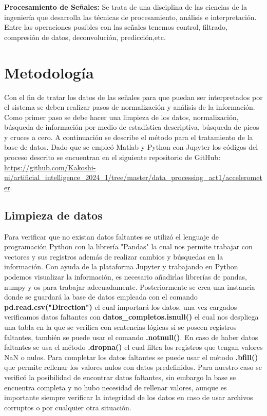 \documentclass[11pt,a4paper]{article}
\begin{document}
\textbf{Procesamiento de Señales:} Se trata de una disciplina de las ciencias de la ingeniería que desarrolla las técnicas de procesamiento, análisis e interpretación. Entre las operaciones posibles con las señales tenemos control, filtrado, compresión de datos, deconvolución, predicción,etc.\cite{signal_processing}
\section{Metodología}
Con el fin de tratar los datos de las señales para que puedan ser interpretados por el sistema se deben realizar pasos de normalización y análisis de la información. Como primer paso se debe hacer una limpieza de los datos, normalización, búsqueda de información por medio de estadística descriptiva, búsqueda de picos y cruces a cero. A continuación se describe el método para el tratamiento de la base de datos. Dado que se empleó Matlab y Python con Jupyter los códigos del proceso descrito se encuentran en el siguiente repositorio de GitHub: \url{https://github.com/Kakoshi-ui/artificial\_intelligence\_2024\_I/tree/master/data\_processing\_act1/accelerometer}.
\subsection{Limpieza de datos}
Para verificar que no existan datos faltantes se utilizó el lenguaje de programación Python con la librería "Pandas" la cual nos permite trabajar con vectores y sus registros además de realizar cambios y búsquedas en la información. Con ayuda de la plataforma Jupyter y trabajando en Python podemos visualizar la información, es necesario añadirlas librerías de pandas, numpy y os para trabajar adecuadamente. Posteriormente se crea una instancia donde se guardará la base de datos empleada con el comando \textbf{pd.read.csv("Direction")} el cual importará los datos. una vez cargados verificamos datos faltantes con \textbf{datos\_completos.isnull()} el cual nos despliega una tabla en la que se verifica con sentencias lógicas si se poseen registros faltantes, también se puede usar el comando \textbf{.notnull()}. En caso de haber datos faltantes se usa el método \textbf{.dropna()} el cual filtra los registros que tengan valores NaN o nulos. Para completar los datos faltantes se puede usar el método \textbf{.bfill()} que permite rellenar los valores nulos con datos predefinidos. Para nuestro caso se verificó la posibilidad de encontrar datos faltantes, sin embargo la base se encuentra completa y no hubo necesidad de rellenar valores, aunque es importante siempre verificar la integridad de los datos en caso de usar archivos corruptos o por cualquier otra situación.
\end{document}
